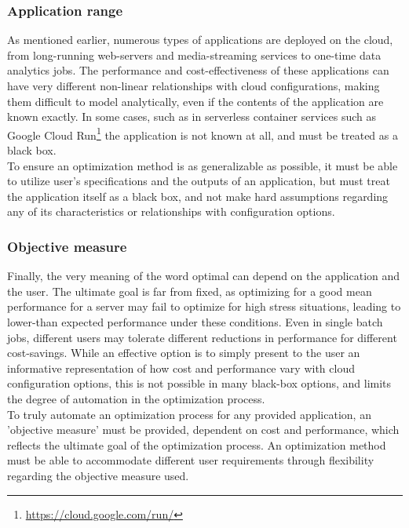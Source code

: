 \documentclass{report}
\begin{document}
\subsubsection{Application range}
As mentioned earlier, numerous types of applications are deployed on the cloud, from long-running web-servers and media-streaming services to one-time data analytics jobs. The performance and cost-effectiveness of these applications can have very different non-linear relationships with cloud configurations, making them difficult to model analytically, even if the contents of the application are known exactly. In some cases, such as in serverless container services such as Google Cloud Run\footnote{\url{https://cloud.google.com/run/}} the application is not known at all, and must be treated as a black box. \\
To ensure an optimization method is as generalizable as possible, it must be able to utilize user's specifications and the outputs of an application, but must treat the application itself as a black box, and not make hard assumptions regarding any of its characteristics or relationships with configuration options.
\subsubsection{Objective measure}
Finally, the very meaning of the word optimal can depend on the application and the user. The ultimate goal is far from fixed, as optimizing for a good mean performance for a server may fail to optimize for high stress situations, leading to lower-than expected performance under these conditions. Even in single batch jobs, different users may tolerate different reductions in performance for different cost-savings. While an effective option is to simply present to the user an informative representation of how cost and performance vary with cloud configuration options, this is not possible in many black-box options, and limits the degree of automation in the optimization process.\\
To truly automate an optimization process for any provided application, an 'objective measure' must be provided, dependent on cost and performance, which reflects the ultimate goal of the optimization process. An optimization method must be able to accommodate different user requirements through flexibility regarding the objective measure used.
\end{document}
